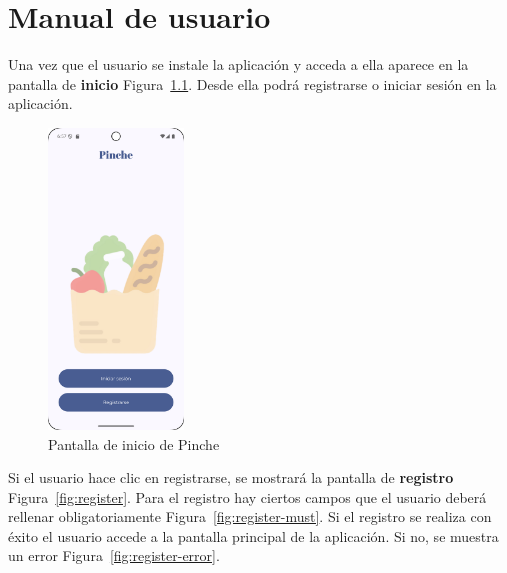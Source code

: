 \cleardoublepage
\appendix
\chapter{Manual de usuario}
\label{app:manual}

Una vez que el usuario se instale la aplicación y acceda a ella aparece en la pantalla de \textbf{inicio} Figura~\ref{fig:start}. Desde ella podrá registrarse o iniciar sesión en la aplicación.

\begin{figure}[H]
\centering
\includegraphics[width=0.32\textwidth]{./img/manual/pinche_first_screen.png}
\caption{Pantalla de inicio de Pinche}
\label{fig:start}
\end{figure}

\clearpage
Si el usuario hace clic en registrarse, se mostrará la pantalla de \textbf{registro} Figura~\ref{fig:register}. Para el registro hay ciertos campos que el usuario deberá rellenar obligatoriamente Figura~\ref{fig:register-must}. Si el registro se realiza con éxito el usuario accede a la pantalla principal de la aplicación. Si no, se muestra un error Figura~\ref{fig:register-error}.

